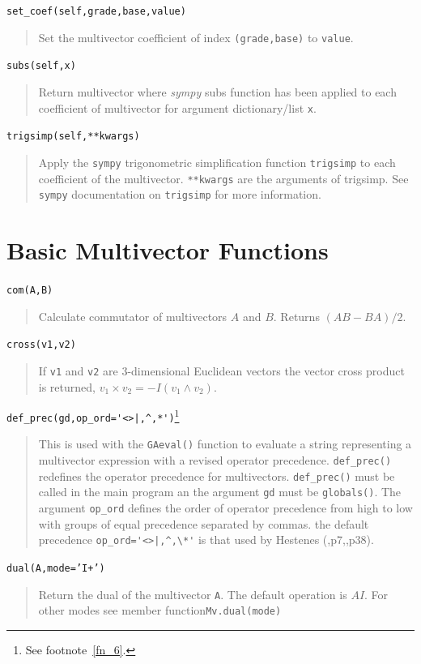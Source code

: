 \documentclass[12pt]{report}
\newcommand{\lp}{\left (}
\newcommand{\rp}{\right )}
\newcommand{\W}{\wedge}
\newcommand{\paren}[1]{\lp {#1} \rp}
\newcommand{\T}[1]{\texttt{#1}}
\begin{document}
\T{set\_coef(self,grade,base,value)}
\begin{quote}
   Set the multivector coefficient of index \T{(grade,base)} to \T{value}.
\end{quote}

\T{subs(self,x)}
\begin{quote}
   Return multivector where \emph{sympy} subs function has been applied to each
   coefficient of multivector for argument dictionary/list \T{x}.
\end{quote}

\T{trigsimp(self,**kwargs)}
\begin{quote}
   Apply the \T{sympy} trigonometric simplification function \T{trigsimp} to
   each coefficient of the multivector. \T{**kwargs} are the arguments of
   trigsimp.  See \T{sympy} documentation on \T{trigsimp} for more information.
\end{quote}

\section{Basic Multivector Functions}

\T{com(A,B)}
\begin{quote}
   Calculate commutator of multivectors $A$ and $B$.  Returns $(AB-BA)/2$.
\end{quote}

\T{cross(v1,v2)}
\begin{quote}
   If \T{v1} and \T{v2} are 3-dimensional Euclidean vectors the vector cross product is
   returned, $v_{1}\times v_{2} = -I\paren{v_{1}\W v_{2}}$.
\end{quote}

\lstinline$def_prec(gd,op_ord='<>|,^,*')$\footnote{See footnote~\ref{fn_6}.}
\begin{quote}
   This is used with the \T{GAeval()} function to evaluate a string representing a multivector
   expression with a revised operator precedence.  \T{def\_prec()} redefines the operator
   precedence for multivectors. \T{def\_prec()} must be called in the main program an the
   argument \T{gd} must be \T{globals()}.  The argument \T{op\_ord} defines the order of operator
   precedence from high to low with groups of equal precedence separated by commas. the default
   precedence \lstinline$op_ord='<>|,^,\*'$ is that used by Hestenes (\cite{Hestenes},p7,\cite{Doran},p38).
\end{quote}

\T{dual(A,mode='I+')}
\begin{quote}
   Return the dual of the multivector \T{A}. The default operation is $AI$.  For other modes see member
   function\T{Mv.dual(mode)}
\end{quote}
\end{document}
